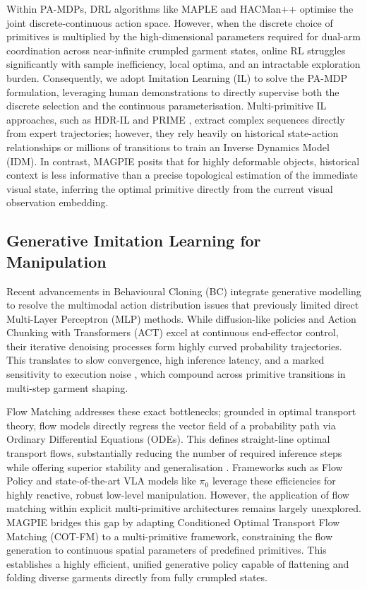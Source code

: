 \documentclass[journal]{IEEEtran}
\begin{document}
Within PA-MDPs, DRL algorithms like MAPLE \cite{nasiriany2022augmenting} and HACMan++ \cite{jiang2024hacman++} optimise the joint discrete-continuous action space. However, when the discrete choice of primitives is multiplied by the high-dimensional parameters required for dual-arm coordination across near-infinite crumpled garment states, online RL struggles significantly with sample inefficiency, local optima, and an intractable exploration burden. Consequently, we adopt Imitation Learning (IL) to solve the PA-MDP formulation, leveraging human demonstrations to directly supervise both the discrete selection and the continuous parameterisation. Multi-primitive IL approaches, such as HDR-IL \cite{xie2020deep} and PRIME \cite{gao2024prime}, extract complex sequences directly from expert trajectories; however, they rely heavily on historical state-action relationships or millions of transitions to train an Inverse Dynamics Model (IDM). In contrast, MAGPIE posits that for highly deformable objects, historical context is less informative than a precise topological estimation of the immediate visual state, inferring the optimal primitive directly from the current visual observation embedding.

\subsection{Generative Imitation Learning for Manipulation}
\label{sec:diffusion_policies}

Recent advancements in Behavioural Cloning (BC) integrate generative modelling to resolve the multimodal action distribution issues that previously limited direct Multi-Layer Perceptron (MLP) methods. While diffusion-like policies \cite{chi2025diffusion} and Action Chunking with Transformers (ACT) \cite{zhao2023learning} excel at continuous end-effector control, their iterative denoising processes form highly curved probability trajectories. This translates to slow convergence, high inference latency, and a marked sensitivity to execution noise \cite{black2024pi0}, which compound across primitive transitions in multi-step garment shaping.

Flow Matching \cite{lipman2022flow} addresses these exact bottlenecks; grounded in optimal transport theory, flow models directly regress the vector field of a probability path via Ordinary Differential Equations (ODEs). This defines straight-line optimal transport flows, substantially reducing the number of required inference steps while offering superior stability and generalisation \cite{zhang2025flowpolicy}. Frameworks such as Flow Policy \cite{zhang2025flowpolicy} and state-of-the-art VLA models like $\pi_0$ \cite{black2024pi0} leverage these efficiencies for highly reactive, robust low-level manipulation. However, the application of flow matching within explicit multi-primitive architectures remains largely unexplored. MAGPIE bridges this gap by adapting Conditioned Optimal Transport Flow Matching (COT-FM) to a multi-primitive framework, constraining the flow generation to continuous spatial parameters of predefined primitives. This establishes a highly efficient, unified generative policy capable of flattening and folding diverse garments directly from fully crumpled states.
\end{document}
